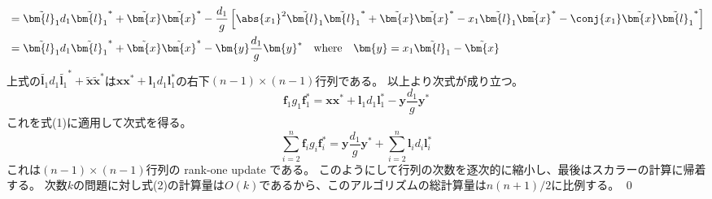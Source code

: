 \begin{derivation*}
\begin{align*}
                &= \tilde{\bm{l}_1}d_1\tilde{\bm{l}_1}^* + \tilde{\bm{x}}\tilde{\bm{x}}^* - \frac{d_1}{g}\left[\abs{x_1}^2\tilde{\bm{l}_1}\tilde{\bm{l}_1}^* + \tilde{\bm{x}}\tilde{\bm{x}}^* - x_1\tilde{\bm{l}_1}\tilde{\bm{x}}^* - \conj{x_1}\tilde{\bm{x}}\tilde{\bm{l}_1}^*\right] \\
                &= \tilde{\bm{l}_1}d_1\tilde{\bm{l}_1}^* + \tilde{\bm{x}}\tilde{\bm{x}}^* - \bm{y}\frac{d_1}{g}\bm{y}^* \quad \text{where} \quad \bm{y} = x_1\tilde{\bm{l}_1} - \tilde{\bm{x}}
            \end{align*}
            上式の$\tilde{\bm{l}_1}d_1\tilde{\bm{l}_1}^* + \tilde{\bm{x}}\tilde{\bm{x}}^*$は$\bm{x}\bm{x}^* + \bm{l}_1 d_1\bm{l}_1^*$の右下$(n-1)\times(n-1)$行列である。
            以上より次式が成り立つ。
            \[ \bm{f}_1 g_1\bm{f}_1^* = \bm{x}\bm{x}^* + \bm{l}_1 d_1\bm{l}_1^* - \bm{y}\frac{d_1}{g}\bm{y}^* \]
            これを式(1)に適用して次式を得る。
            \[ \sum_{i=2}^n \bm{f}_i g_i\bm{f}_i^* = \bm{y}\frac{d_1}{g}\bm{y}^* + \sum_{i=2}^n \bm{l}_i d_i\bm{l}_i^* \]
            これは$(n-1)\times(n-1)$行列の rank-one update である。
            このようにして行列の次数を逐次的に縮小し、最後はスカラーの計算に帰着する。
            次数$k$の問題に対し式(2)の計算量は$O(k)$であるから、このアルゴリズムの総計算量は$n(n+1)/2$に比例する。
            \qed
        \end{derivation*}
